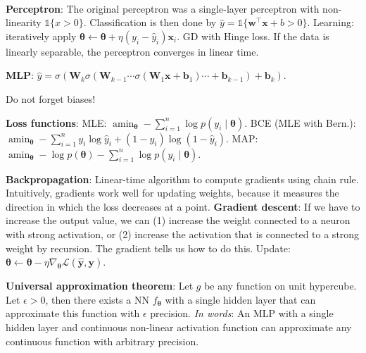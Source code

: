 \documentclass{article}
\DeclareMathOperator*{\argmin}{amin}
\newcommand{\lft}{\mathopen{}\mathclose\bgroup\left}
\newcommand{\rgt}{\aftergroup\egroup\right}
\renewcommand{\vec}[1]{\bm{#1}}
\newcommand{\mat}[1]{\bm{#1}}
\newenvironment{topic}[1]
{\textbf{\sffamily \colorbox{black}{\rlap{\textbf{\textcolor{white}{#1}}}\hspace{\linewidth}\hspace{-2\fboxsep}}} \\ \vspace{0.2cm}}
{}
\begin{document}
\begin{multicols*}{2}
\begin{itemize}
    \end{itemize}


    \begin{topic}{Neural networks}

        \textbf{Perceptron}: The original perceptron was a single-layer perceptron with non-linearity
        $\mathds{1}\{ x > 0 \}$. Classification is then done by $\hat{y} = \mathds{1}\{ \vec{w}^\top
            \vec{x} + b > 0 \}$. Learning: iteratively apply $\vec{\theta} \gets
            \vec{\theta} + \eta(y_i - \hat{y}_i) \vec{x}_i$. GD with Hinge loss.
        If the data is linearly separable, the perceptron converges in linear time.

        \textbf{MLP}: $\hat{y} = \sigma (\mat{W}_k \sigma( \mat{W}_{k-1} \cdots \sigma( \mat{W}_1 \vec{x} + \vec{b}_1 ) \cdots + \vec{b}_{k-1} ) + \vec{b}_k )$.

        Do not forget biases!

        \textbf{Loss functions}: MLE: $\argmin_{\vec{\theta}} - \sum_{i=1}^{n} \log p(y_i \mid \vec{\theta})$.
        BCE (MLE with Bern.): $\argmin_{\vec{\theta}} - \sum_{i=1}^{n} y_i \log \hat{y}_i + (1-y_i) \log (1 - \hat{y}_i)$.
        MAP: $\argmin_{\vec{\theta}} - \log p(\vec{\theta}) - \sum_{i=1}^{n} \log p(y_i \mid \vec{\theta})$.

        \textbf{Backpropagation}: Linear-time algorithm to compute gradients using chain rule.
        Intuitively, gradients work well for updating weights, because it measures the direction in
        which the loss decreases at a point. \textbf{Gradient descent}: If we have to increase the
        output value, we can (1) increase the weight connected to a neuron with strong activation, or
        (2) increase the activation that is connected to a strong weight by recursion. The gradient
        tells us how to do this. Update: $\vec{\theta} \gets \vec{\theta} - \eta \nabla_{\vec{\theta}} \mathcal{L}(\hat{\vec{y}}, \vec{y})$.

        \textbf{Universal approximation theorem}: Let $g$ be any function on unit hypercube. Let
        $\epsilon > 0$, then there exists a NN $f_{\vec{\theta}}$ with a single hidden layer that can
        approximate this function with $\epsilon$ precision. \textit{In words}: An MLP with a single
        hidden layer and continuous non-linear activation function can approximate any continuous
        function with arbitrary precision.


\end{topic}
\end{multicols*}
\end{document}
